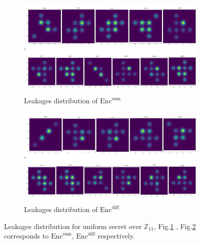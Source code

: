 \documentclass{llncs}
\begin{document}
	\begin{figure}
		\centering
		\begin{subfigure}{1\linewidth}
			\centering
			\includegraphics[scale=0.25]{figures/11_dist_sum.png}
			\caption{Leakages distribution of $\text{Enc}^{\text{sum}}$ }
			\label{fig:dist11_sum}
		\end{subfigure} %
		
		\hfill
		
		\begin{subfigure}{1\linewidth}
			\includegraphics[scale=0.25]{figures/11_dist_diff.png}
			\caption{Leakages distribution of $\text{Enc}^{\text{diff}}$ }
			\label{fig:dist11_diff}
		\end{subfigure}
		\caption{Leakages distribution for uniform secret over $\mathbb{Z}_{11}$, Fig.\ref{fig:dist11_sum} , Fig.\ref{fig:dist11_diff} corresponds to $\text{Enc}^{\text{sum}}$, $\text{Enc}^{\text{diff}}$ respectively.}
		\label{fig:dist11}
	\end{figure}
	
\end{document}

